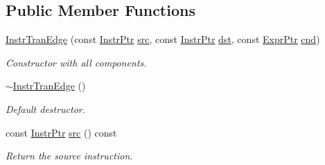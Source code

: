 \subsection*{Public Member Functions}
\begin{DoxyCompactItemize}
\item 
\mbox{\label{classilang_1_1_instr_tran_edge_a67aee6a9bb66a3392f1594b2d9d67f0a}} 
\mbox{\hyperlink{classilang_1_1_instr_tran_edge_a67aee6a9bb66a3392f1594b2d9d67f0a}{Instr\+Tran\+Edge}} (const \mbox{\hyperlink{namespaceilang_af88a19312ae653d687a0d1207bb284f6}{Instr\+Ptr}} \mbox{\hyperlink{classilang_1_1_instr_tran_edge_ae3b6f3684b98eeaf817421aa8773dc2f}{src}}, const \mbox{\hyperlink{namespaceilang_af88a19312ae653d687a0d1207bb284f6}{Instr\+Ptr}} \mbox{\hyperlink{classilang_1_1_instr_tran_edge_a5d2048dcd17f66e21ae7fc73347402fe}{dst}}, const \mbox{\hyperlink{namespaceilang_a7c4196c72e53ea4df4b7861af7bc3bce}{Expr\+Ptr}} \mbox{\hyperlink{classilang_1_1_instr_tran_edge_ab6637ebd4055b22e3146a40bdaea2fdd}{cnd}})
\begin{DoxyCompactList}\small\item\em Constructor with all components. \end{DoxyCompactList}\item 
\mbox{\label{classilang_1_1_instr_tran_edge_a7b5476f77b3650168d44fa83f35a7cae}} 
\mbox{\hyperlink{classilang_1_1_instr_tran_edge_a7b5476f77b3650168d44fa83f35a7cae}{$\sim$\+Instr\+Tran\+Edge}} ()
\begin{DoxyCompactList}\small\item\em Default destructor. \end{DoxyCompactList}\item 
\mbox{\label{classilang_1_1_instr_tran_edge_ae3b6f3684b98eeaf817421aa8773dc2f}} 
const \mbox{\hyperlink{namespaceilang_af88a19312ae653d687a0d1207bb284f6}{Instr\+Ptr}} \mbox{\hyperlink{classilang_1_1_instr_tran_edge_ae3b6f3684b98eeaf817421aa8773dc2f}{src}} () const
\begin{DoxyCompactList}\small\item\em Return the source instruction. \end{DoxyCompactList}\item 
\mbox{\label{classilang_1_1_instr_tran_edge_a5d2048dcd17f66e21ae7fc73347402fe}} 

\end{DoxyCompactItemize}

